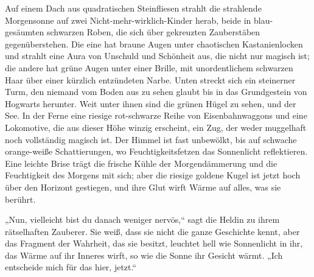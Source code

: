 \later

Auf einem Dach aus quadratischen Steinfliesen strahlt die strahlende Morgensonne auf zwei Nicht-mehr-wirklich-Kinder herab, beide in blau-gesäumten schwarzen Roben, die sich über gekreuzten Zauberstäben gegenüberstehen.
Die eine hat braune Augen unter chaotischen Kastanienlocken und strahlt eine Aura von Unschuld und Schönheit aus, die nicht nur magisch ist; die andere hat grüne Augen unter einer Brille, mit unordentlichem schwarzen Haar über einer kürzlich entzündeten Narbe. Unten streckt sich ein steinerner Turm, den niemand vom Boden aus zu sehen glaubt bis in das Grundgestein von Hogwarts herunter. Weit unter ihnen sind die grünen Hügel zu sehen, und der See. In der Ferne eine riesige rot-schwarze Reihe von Eisenbahnwaggons und eine Lokomotive, die aus dieser Höhe winzig erscheint, ein Zug, der weder muggelhaft noch vollständig magisch ist. Der Himmel ist fast unbewölkt, bis auf schwache orange-weiße Schattierungen, wo Feuchtigkeitsfetzen das Sonnenlicht reflektieren. Eine leichte Brise trägt die frische Kühle der Morgendämmerung und die Feuchtigkeit des Morgens mit sich; aber die riesige goldene Kugel ist jetzt hoch über den Horizont gestiegen, und ihre Glut wirft Wärme auf alles, was sie berührt.

„Nun, vielleicht bist du danach weniger nervös,“ sagt die Heldin zu ihrem rätselhaften Zauberer. Sie weiß, dass sie nicht die ganze Geschichte kennt, aber das Fragment der Wahrheit, das sie besitzt, leuchtet hell wie Sonnenlicht in ihr, das Wärme auf ihr Inneres wirft, so wie die Sonne ihr Gesicht wärmt.
„Ich entscheide mich für das hier, jetzt.“

